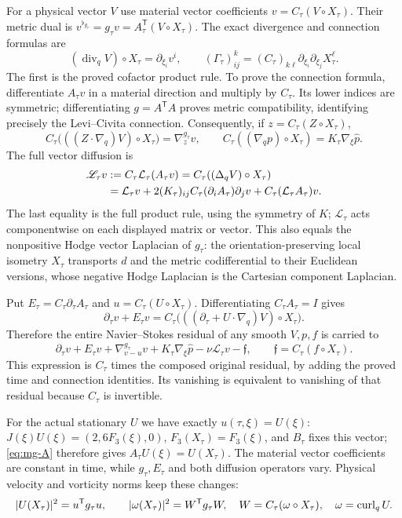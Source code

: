 For a physical vector $V$ use material vector coefficients
$v=C_\tau(V\circ X_\tau)$. Their metric dual is
$v^{\flat_{g_\tau}}=g_\tau v=A_\tau^{\mathsf T}(V\circ X_\tau)$.
The exact divergence and connection formulas are
\[
 (\operatorname{div}_q V)\circ X_\tau=\partial_{\xi_i}v^i,\qquad
 (\Gamma_\tau)^k_{ij}=(C_\tau)_{k\ell}\partial_{\xi_i}\partial_{\xi_j}X^\ell_\tau.
\]
The first is the proved cofactor product rule. To prove the connection
formula, differentiate $A_\tau v$ in a material direction and multiply
by $C_\tau$. Its lower indices are symmetric; differentiating
$g=A^{\mathsf T}A$ proves metric compatibility, identifying precisely
the Levi--Civita connection. Consequently, if $z=C_\tau(Z\circ X_\tau)$,
\[
 C_\tau\bigl(((Z\cdot\nabla_q)V)\circ X_\tau\bigr)=\nabla^{g_\tau}_zv,
 \qquad C_\tau((\nabla_qp)\circ X_\tau)=K_\tau\nabla_\xi\widehat p.
\]
The full vector diffusion is
\begin{align}
 \mathscr L_\tau v
 &:=C_\tau\mathcal L_\tau(A_\tau v)
   =C_\tau((\Delta_qV)\circ X_\tau)\notag\\
 &=\mathcal L_\tau v+
  2(K_\tau)_{ij}C_\tau(\partial_iA_\tau)\partial_jv
   +C_\tau(\mathcal L_\tau A_\tau)v .
 \label{eq:mg-vector-diffusion}
\end{align}
The last equality is the full product rule, using the symmetry of $K$;
$\mathcal L_\tau$ acts componentwise on each displayed matrix or vector.
This also equals the nonpositive Hodge vector Laplacian of $g_\tau$:
the orientation-preserving local isometry $X_\tau$ transports $d$
and the metric codifferential to their Euclidean versions, whose
negative Hodge Laplacian is the Cartesian component Laplacian.

Put $E_\tau=C_\tau\partial_\tau A_\tau$ and
$u=C_\tau(U\circ X_\tau)$. Differentiating $C_\tau A_\tau=I$ gives
\[
 \partial_\tau v+E_\tau v
 =C_\tau\bigl(((\partial_\tau+U\cdot\nabla_q)V)\circ X_\tau\bigr).
\]
Therefore the entire Navier--Stokes residual of any smooth $V,p,f$
is carried to
\begin{equation}\label{eq:mg-momentum}
 \partial_\tau v+E_\tau v+\nabla^{g_\tau}_{v-u}v
  +K_\tau\nabla_\xi\widehat p-\nu\mathscr L_\tau v-\mathfrak f,
 \qquad \mathfrak f=C_\tau(f\circ X_\tau).
\end{equation}
This expression is $C_\tau$ times the composed original residual,
by adding the proved time and connection identities. Its vanishing is
equivalent to vanishing of that residual because $C_\tau$ is invertible.

For the actual stationary $U$ we have exactly $u(\tau,\xi)=U(\xi)$:
$J(\xi)U(\xi)=(2,6F_3(\xi),0)$, $F_3(X_\tau)=F_3(\xi)$,
and $B_\tau$ fixes this vector; \eqref{eq:mg-A} therefore gives
$A_\tau U(\xi)=U(X_\tau)$. The material vector coefficients are constant
in time, while $g_\tau,E_\tau$ and both diffusion operators vary.
Physical velocity and vorticity norms keep these changes:
\[
 |U(X_\tau)|^2=u^{\mathsf T}g_\tau u,\qquad
 |\omega(X_\tau)|^2=W^{\mathsf T}g_\tau W,\quad
 W=C_\tau(\omega\circ X_\tau),\quad\omega=\operatorname{curl}_qU.
\]

